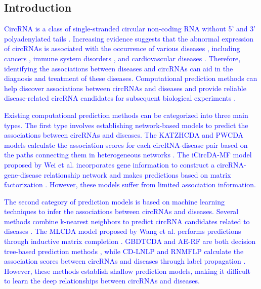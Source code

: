 \documentclass{bioinfo}
\begin{document}
\begin{methods}
\section{Introduction}
\textcolor{blue}{CircRNA is a class of single-stranded circular non-coding RNA without 5' and 3' polyadenylated tails \cite{jeck2014detecting}. Increasing evidence suggests that the abnormal expression of circRNAs is associated with the occurrence of various diseases \cite{abdelmohsen2017identification}, including cancers \cite{gao2019circular, li2019tumor, liang2020autophagy}, immune system disorders \cite{wang2018circibtk}, and cardiovascular diseases \cite{khan2016rbm20, siede2017identification, jin2019silencing}. Therefore, identifying the associations between diseases and circRNAs can aid in the diagnosis and treatment of these diseases. Computational prediction methods can help discover associations between circRNAs and diseases and provide reliable disease-related circRNA candidates for subsequent biological experiments \cite{lan2023benchmarking, yang2021predicting}.}

\textcolor{blue}{Existing computational prediction methods can be categorized into three main types. The first type involves establishing network-based models to predict the associations between circRNAs and diseases. The KATZHCDA and PWCDA models calculate the association scores for each circRNA-disease pair based on the paths connecting them in heterogeneous networks \cite{fan2018prediction, lei2018pwcda}. The iCircDA-MF model proposed by Wei et al. incorporates gene information to construct a circRNA-gene-disease relationship network and makes predictions based on matrix factorization \cite{wei2020icircda}. However, these models suffer from limited association information.}

\textcolor{blue}{The second category of prediction models is based on machine learning techniques to infer the associations between circRNAs and diseases. Several methods combine k-nearest neighbors to predict circRNA candidates related to diseases \cite{wang2022combining, lei2020integrating, yan2018dwnn}. The MLCDA model proposed by Wang et al. performs predictions through inductive matrix completion \cite{wang2022machine}. GBDTCDA and AE-RF are both decision tree-based prediction methods \cite{lei2019gbdtcda, deepthi2021inferring}, while CD-LNLP and RNMFLP calculate the association scores between circRNAs and diseases through label propagation \cite{zhang2019predicting, peng2022rnmflp}. However, these methods establish shallow prediction models, making it difficult to learn the deep relationships between circRNAs and diseases.}


\end{methods}
\end{document}
